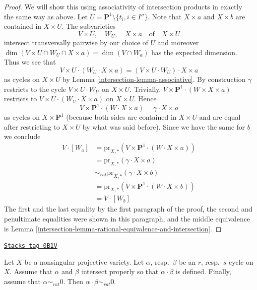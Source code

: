\begin{proof}
\medskip\noindent
We will show this using associativity of intersection products in exactly
the same way as above. Let $U = \mathbf{P}^1 \setminus \{t_i, i \in I''\}$.
Note that $X \times a$ and $X \times b$ are contained in $X \times U$.
The subvarieties
$$
V \times U,\quad W_U,\quad X \times a\quad\text{of}\quad X \times U
$$
intersect transversally pairwise by our choice of $U$ and moreover
$\dim(V \times U \cap W_U \cap X \times a) = \dim(V \cap W_a)$ has
the expected dimension. Thus we see that
$$
V \times U \cdot (W_U \cdot X \times a) =
(V \times U \cdot W_U) \cdot X \times a
$$
as cycles on $X \times U$ by Lemma \ref{intersection-lemma-associative}.
By construction $\gamma$ restricts to the cycle $V \times U \cdot W_U$
on $X \times U$. Trivially,
$V \times \mathbf{P}^1 \cdot (W \times X \times a)$ restricts
to $V \times U \cdot (W_U \cdot X \times a)$ on $X \times U$.
Hence
$$
V \times \mathbf{P}^1 \cdot (W \cdot X \times a) =
\gamma \cdot X \times a
$$
as cycles on $X \times \mathbf{P}^1$ (because both sides
are contained in $X \times U$ and are equal after restricting
to $X \times U$ by what was said before). Since we have the same for $b$
we conclude
\begin{align*}
V \cdot [W_a]
& =
\text{pr}_{X,*}(V \times \mathbf{P}^1 \cdot (W \cdot X\times a)) \\
& =
\text{pr}_{X, *}(\gamma \cdot X \times a) \\
& \sim_{rat}
\text{pr}_{X, *}(\gamma \cdot X \times b) \\
& =
\text{pr}_{X,*}(V \times \mathbf{P}^1 \cdot (W \cdot X\times b)) \\
& =
V \cdot [W_b]
\end{align*}
The first and the last equality by the first paragraph of the proof,
the second and penultimate equalities were shown in this paragraph, and
the middle equivalence is
Lemma \ref{intersection-lemma-rational-equivalence-and-intersection}.
\end{proof}

\begin{theorem}
\label{intersection-theorem-well-defined}
\href{https://stacks.math.columbia.edu/tag/0B1V}{\texttt{Stacks tag 0B1V}}

Let $X$ be a nonsingular projective variety. Let $\alpha$, resp.\ $\beta$
be an $r$, resp.\ $s$ cycle on $X$. Assume that $\alpha$ and $\beta$
intersect properly so that $\alpha \cdot \beta$ is defined. Finally,
assume that $\alpha \sim_{rat} 0$. Then $\alpha \cdot \beta \sim_{rat} 0$.
\end{theorem}

